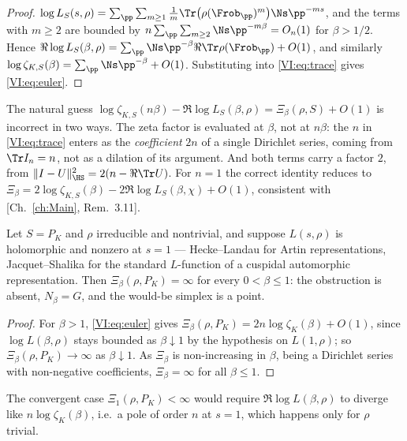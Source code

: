 \begin{proof}
$\log L_S(s,\rho)=\sum_\pp\sum_{m\ge1}\tfrac1m\Tr\bigl(\rho(\Frob_\pp)^m\bigr)\Ns\pp^{-ms}$,
and the terms with $m\ge2$ are bounded by $n\sum_\pp\sum_{m\ge2}\Ns\pp^{-m\beta}=O_n(1)$ for
$\beta>1/2$. Hence
$\Re\log L_S(\beta,\rho)=\sum_\pp\Ns\pp^{-\beta}\Re\Tr\rho(\Frob_\pp)+O(1)$, and similarly
$\log\zeta_{K,S}(\beta)=\sum_\pp\Ns\pp^{-\beta}+O(1)$. Substituting into \eqref{VI:eq:trace}
gives \eqref{VI:eq:euler}.
\end{proof}

\begin{remark}\label{VI:rem:constants}
The natural guess $\log\zeta_{K,S}(n\beta)-\Re\log L_S(\beta,\rho)=\Xi_\beta(\rho,S)+O(1)$ is
incorrect in two ways. The zeta factor is evaluated at $\beta$, not at $n\beta$: the $n$ in
\eqref{VI:eq:trace} enters as the \emph{coefficient} $2n$ of a single Dirichlet series, coming
from $\Tr I_n=n$, not as a dilation of its argument. And both terms carry a factor $2$, from
$\|I-U\|^2_{\HS}=2(n-\Re\Tr U)$. For $n=1$ the correct identity reduces to
$\Xi_\beta=2\log\zeta_{K,S}(\beta)-2\Re\log L_S(\beta,\chi)+O(1)$, consistent with
[Ch.~\ref{ch:Main}, Rem.~3.11].
\end{remark}

\begin{corollary}\label{VI:cor:full}
Let $S=P_K$ and $\rho$ irreducible and nontrivial, and suppose $L(s,\rho)$ is holomorphic
and nonzero at $s=1$ --- Hecke--Landau for Artin representations, Jacquet--Shalika
\cite{JS} for the standard $L$-function of a cuspidal automorphic representation. Then
$\Xi_\beta(\rho,P_K)=\infty$ for every $0<\beta\le1$: the obstruction is absent,
$N_\beta=G$, and the would-be simplex is a point.
\end{corollary}

\begin{proof}
For $\beta>1$, \eqref{VI:eq:euler} gives $\Xi_\beta(\rho,P_K)=2n\log\zeta_K(\beta)+O(1)$, since
$\log L(\beta,\rho)$ stays bounded as $\beta\downarrow1$ by the hypothesis on $L(1,\rho)$;
so $\Xi_\beta(\rho,P_K)\to\infty$ as $\beta\downarrow1$. As $\Xi_\beta$ is non-increasing
in $\beta$, being a Dirichlet series with non-negative coefficients, $\Xi_\beta=\infty$ for
all $\beta\le1$.
\end{proof}

The convergent case $\Xi_1(\rho,P_K)<\infty$ would require $\Re\log L(\beta,\rho)$ to
diverge like $n\log\zeta_K(\beta)$, i.e.\ a pole of order $n$ at $s=1$, which happens only
for $\rho$ trivial.

